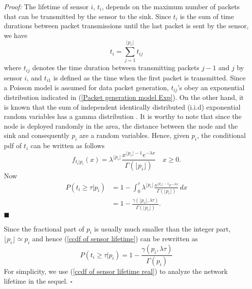 \documentclass[conference]{IEEEtran}
\begin{document}
\textit{Proof:} The lifetime of sensor $i$, $t_i$, depends on the
maximum number of packets that can be transmitted by the sensor to
the sink. Since $t_i$ is the sum of time durations between packet
transmissions until the last packet is sent by the sensor, we have
\begin{equation}\label{t_i the sum of t_ij}
t_i = \sum_{j=1}^{\lfloor p_i \rfloor} t_{ij}
\end{equation}
where $t_{ij}$ denotes the time duration between transmitting
packets $j-1$ and $j$ by sensor $i$, and $t_{i1}$ is defined as the
time when the first packet is transmitted. Since a Poisson model is
assumed for data packet generation, $t_{ij}$'s obey an exponential
distribution indicated in (\ref{Packet generation model Exp}). On
the other hand, it is known that the sum of independent identically
distributed (i.i.d) exponential random variables has a gamma
distribution \cite{Ross_Prob}. It is worthy to note that since the
node is deployed randomly in the area, the distance between the node
and the sink and consequently $p_i$ are a random variables. Hence,
given $p_i$, the conditional pdf of $t_i$ can be written as follows
\begin{equation}\label{pdf of t_i ineteger}
f_{t_i \vert p_i}(x) = \lambda ^{\lfloor p_i \rfloor } \frac
{x^{\lfloor p_i \rfloor - 1} e^{-\lambda x}} {\Gamma \left (\lfloor
p_i \rfloor \right )}  \quad x \geq 0.
\end{equation}
Now
\begin{align}
P(t_i \geq \tau \vert p_i) & =  1 - \int_0^{\tau} \lambda ^{\lfloor
p_i \rfloor} \frac {x^{\lfloor p_i \rfloor
-1} e^{-\lambda x}} {\Gamma( \lfloor p_i \rfloor)}\,dx \nonumber \\
& = 1 - \frac{\gamma (\lfloor p_i \rfloor,\lambda
\tau)}{\Gamma(\lfloor p_i \rfloor)} \label{ccdf of sensor lifetime}.
\end{align} \hfill $\blacksquare$

\prop \label{approx floorP by P} Since the fractional part of $p_i$
is usually much smaller than the integer part, $\lfloor p_i \rfloor
\simeq p_i$ and hence (\ref{ccdf of sensor lifetime}) can be
rewritten as
\begin{equation}\label{ccdf of sensor lifetime real}
P(t_i \geq \tau \vert p_i) = 1 - \frac{\gamma (p_i,\lambda
\tau)}{\Gamma(p_i)}
\end{equation}
For simplicity, we use (\ref{ccdf of sensor lifetime
real}) to analyze the network lifetime in the sequel.
$\square$
\end{document}
